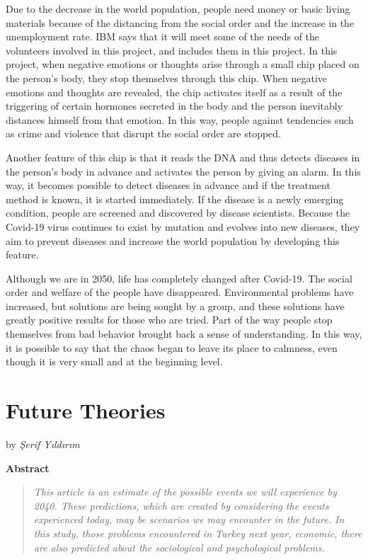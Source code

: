 \documentclass[]{book}
\begin{document}
Due to the decrease in the world population, people need money or basic living materials because of the distancing from the social order and the increase in the unemployment rate. IBM says that it will meet some of the needs of the volunteers involved in this project, and includes them in this project. In this project, when negative emotions or thoughts arise through a small chip placed on the person's body, they stop themselves through this chip. When negative emotions and thoughts are revealed, the chip activates itself as a result of the triggering of certain hormones secreted in the body and the person inevitably distances himself from that emotion. In this way, people against tendencies such as crime and violence that disrupt the social order are stopped.

Another feature of this chip is that it reads the DNA and thus detects diseases in the person's body in advance and activates the person by giving an alarm. In this way, it becomes possible to detect diseases in advance and if the treatment method is known, it is started immediately. If the disease is a newly emerging condition, people are screened and discovered by disease scientists. Because the Covid-19 virus continues to exist by mutation and evolves into new diseases, they aim to prevent diseases and increase the world population by developing this feature.

Although we are in 2050, life has completely changed after Covid-19. The social order and welfare of the people have disappeared. Environmental problems have increased, but solutions are being sought by a group, and these solutions have greatly positive results for those who are tried. Part of the way people stop themselves from bad behavior brought back a sense of understanding. In this way, it is possible to say that the chaos began to leave its place to calmness, even though it is very small and at the beginning level.

\hypertarget{future-theories}{%
\chapter{Future Theories}\label{future-theories}}

by \emph{Şerif Yıldırım}

\textbf{Abstract}

\begin{quote}
\emph{This article is an estimate of the possible events we will experience by 2040. These predictions, which are created by considering the events experienced today, may be scenarios we may encounter in the future. In this study, those problems encountered in Turkey next year, economic, there are also predicted about the sociological and psychological problems.}
\end{quote}
\end{document}
